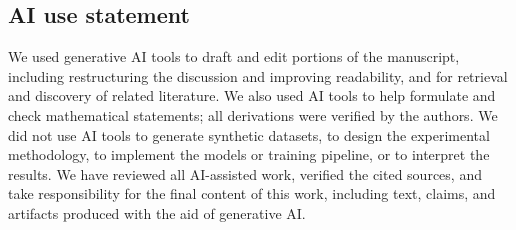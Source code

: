 \subsection*{AI use statement}

We used generative AI tools to draft and edit portions of the manuscript,
including restructuring the discussion and improving readability, and for
retrieval and discovery of related literature. We also used AI tools to help
formulate and check mathematical statements; all derivations were verified by
the authors. We did not use AI tools to generate synthetic
datasets, to design the experimental methodology, to implement the models or
training pipeline, or to interpret the results. We have reviewed all
AI-assisted work, verified the cited sources, and take responsibility for the
final content of this work, including text, claims, and artifacts produced
with the aid of generative AI.
